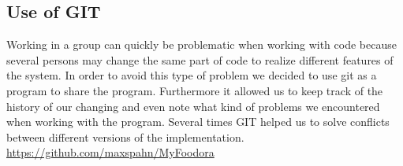 \subsection{Use of GIT}
\label{sub:use_of_git}

Working in a group can quickly be problematic when working with code because several persons
may change the same part of code to realize different features of the system. In order to 
avoid this type of problem we decided to use git as a program to share the program. 
Furthermore it allowed us to keep track of the history of our changing and even note what
kind of problems we encountered when working with the program. Several times \textsc{GIT}
helped us to solve conflicts between different versions of the implementation.
\url{https://github.com/maxspahn/MyFoodora}
